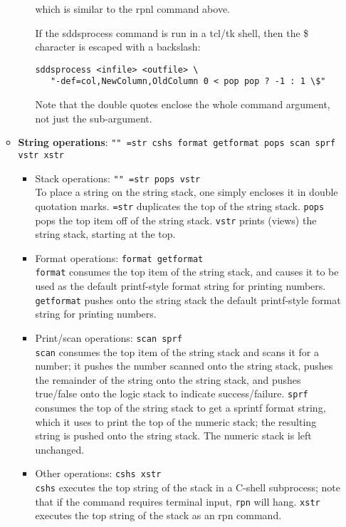 \begin{itemize}
\begin{itemize}
\begin{itemize}
\begin{flushleft}
\begin{verbatim}
\end{verbatim}
\end{flushleft}
which is similar to the rpnl command above.

If the sddsprocess command is run in a tcl/tk shell, then the \$ character is escaped with a backslash:\\
\begin{flushleft}
\begin{verbatim}
sddsprocess <infile> <outfile> \
   "-def=col,NewColumn,OldColumn 0 < pop pop ? -1 : 1 \$"

\end{verbatim}
\end{flushleft}
Note that the double quotes enclose the whole command argument, not just the sub-argument.

\end{itemize}
\item {\bf String operations}: {\tt "" =str cshs format getformat pops scan sprf vstr xstr}\\

\begin{itemize}
\item Stack operations: {\tt "" =str pops vstr}\\
To place a string on the string stack, one simply encloses it in double quotation marks.
{\tt =str} duplicates the top of the string stack.  {\tt pops} pops the top item off
of the string stack.  {\tt vstr} prints (views) the string stack, starting at the top.
\item Format operations: {\tt format getformat}\\
{\tt format} consumes the top item of the string stack, and causes it to be used as
the default printf-style format string for printing numbers.  {\tt getformat} 
pushes onto the string stack the default printf-style format string for printing numbers.
\item Print/scan operations: {\tt scan sprf}\\
{\tt scan} consumes the top item of the string stack and scans it for a number; it
pushes the number scanned onto the string stack, pushes the remainder of the string
onto the string stack, and pushes true/false onto the logic stack to indicate
success/failure.  {\tt sprf} consumes the top of the string stack to get a sprintf
format string, which it uses to print the top of the numeric stack; the resulting
string is pushed onto the string stack.  The numeric stack is left unchanged.
\item Other operations: {\tt cshs xstr}\\
{\tt cshs} executes the top string of the stack in a C-shell subprocess; note that
if the command requires terminal input, {\tt rpn} will hang.  {\tt xstr} executes
the top string of the stack as an rpn command.
\end{itemize}


\end{itemize}
\end{itemize}
